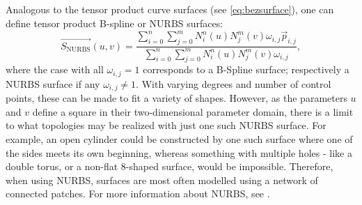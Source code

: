 Analogous to the tensor product \Bez curve surfaces (see \autoref{eq:bezsurface}), one can define tensor product B-spline or NURBS surfaces:
\begin{equation}
\label{eq:nurbssurface}
\vec{S_\text{NURBS}}(u,v)=\frac{\sum\limits_{i=0}^n \sum\limits_{j=0}^m N_{i}^n(u) N_{j}^m(v) \omega_{i,j}\vec{p}_{i,j}}{\sum\limits_{i=0}^n \sum\limits_{j=0}^m N_{i}^n(u) N_{j}^m(v) \omega_{i,j}},
\end{equation}
where the case with all $\omega_{i,j} = 1$ corresponds to a B-Spline surface; respectively a NURBS surface if any $\omega_{i,j} \neq 1 $. With varying degrees and number of control points, these can be made to fit a variety of shapes. However, as the parameters $u$ and $v$ define a square in their two-dimensional parameter domain, there is a limit to what topologies may be realized with just one such NURBS surface. For example, an open cylinder could be constructed by one such surface where one of the sides meets its own beginning, whereas something with multiple holes - like a double torus, or a non-flat 8-shaped surface, would be impossible. Therefore, when using NURBS, surfaces are most often modelled using a network of connected patches.  For more information about NURBS, see \cite{farin1999nurbs}.
